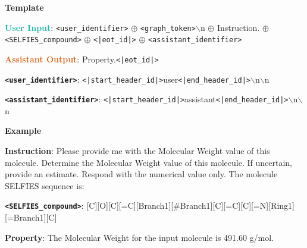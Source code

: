 \begin{tcolorbox}[colback=white!98!black,colframe=white!30!black,boxsep=1.1pt,top=6.75pt]%
\vspace{1.75pt}%
\scriptsize
\noindent\makebox[\textwidth]{\rule{\textwidth}{1pt}}
\textbf{Template}
\\[-0.575em]
\noindent\makebox[\textwidth]{\rule{\textwidth}{1pt}}

\textbf{\textcolor[HTML]{20B2AA}{User Input}}: {\tt <user\_identifier>} $\oplus$ {\tt <graph\_token>}$\backslash$n $\oplus$ Instruction. $\oplus$ {\tt <SELFIES\_compound>} $\oplus$ {\tt <|eot\_id|>} $\oplus$ {\tt <assistant\_identifier>}

\textbf{\textcolor[HTML]{D2691E}{Assistant Output}}: Property.{\tt <|eot\_id|>}

{\tt \textbf{<user\_identifier>}}: {\tt <|start\_header\_id|>}user{\tt <|end\_header\_id|>}$\backslash$n$\backslash$n

{\tt \textbf{<assistant\_identifier>}}: {\tt <|start\_header\_id|>}assistant{\tt <|end\_header\_id|>}$\backslash$n$\backslash$n

\noindent\makebox[\textwidth]{\rule{\textwidth}{1pt}}
\textbf{Example}
\\[-0.575em]
\noindent\makebox[\textwidth]{\rule{\textwidth}{1pt}}

\begin{tcolorbox}[colback=cyan!7!white,colframe=white!98!black,boxsep=1.1pt,top=6.75pt]
\textbf{Instruction}: Please provide me with the Molecular Weight value of this molecule. Determine the Molecular Weight value of this molecule. If uncertain, provide an estimate. Respond with the numerical value only. The molecule SELFIES sequence is:

{\tt \textbf{<SELFIES\_compound>}}: [C][O][C][=C][Branch1][\#Branch1][C][=C][C][=N][Ring1][=Branch1][C]\-[=Branch1][C][=O][N][C][C][C][C][C][N][Branch1] [Branch1][C][C][Ring1][=Branch1][S][=Branch1][C][=O]\-[=Branch1][C][=O][N][C][=Branch1][C][=O][N][C][C][C][C][C][C][Ring1] [Branch1][C][=C][Ring1][Branch1]

\end{tcolorbox}

\begin{tcolorbox}[colback=orange!7!white,colframe=white!98!black,boxsep=1.1pt,top=6.75pt]
\textbf{Property}: The Molecular Weight for the input molecule is 491.60 g/mol.
\end{tcolorbox}

\end{tcolorbox}

